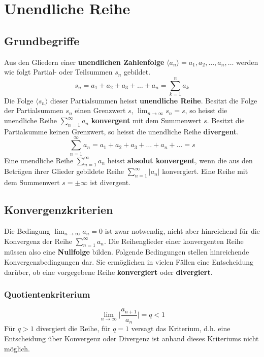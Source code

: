 \section{Unendliche Reihe}
\subsection{Grundbegriffe}
Aus den Gliedern einer \textbf{unendlichen Zahlenfolge} $\langle a_n\rangle=a_1, a_2,\dotso, a_n, \dotso$ werden wie folgt Partial- oder Teilsummen $s_n$ gebildet.
\begin{equation}
\boxed{s_n=a_1+a_2+a_3+\dotso + a_n=\displaystyle \sum_{k=1}^na_k}
\end{equation}
Die Folge $\langle s_n\rangle$ dieser Partialsummen heisst \textbf{unendliche Reihe}. Besitzt die Folge der Partialsummen $s_n$ einen Grenzwert $s$, $\displaystyle \lim_{n\rightarrow \infty}s_n=s$, so heisst die unendliche Reihe $\displaystyle \sum_{n=1}^{\infty}a_n$ \textbf{konvergent} mit dem Summenwert $s$. Besitzt die Partialsumme keinen Grenzwert, so heisst die unendliche Reihe \textbf{divergent}. 
\begin{equation}
\boxed{\displaystyle \sum_{n=1}^{\infty}a_n=a_1+a_2+a_3+\dotso + a_n+\dotso=s}
\end{equation}
Eine unendliche Reihe $\displaystyle \sum_{n=1}^{\infty}a_n$ heisst \textbf{absolut konvergent}, wenn die aus den Beträgen ihrer Glieder gebildete Reihe $\displaystyle \sum_{n=1}^{\infty}\Big\vert a_n\Big\vert$ konvergiert. Eine Reihe mit dem Summenwert $s=\pm\infty$ ist divergent.
\subsection{Konvergenzkriterien}
Die Bedingung $\displaystyle \lim_{n\rightarrow \infty}a_n=0$ ist zwar notwendig, nicht aber hinreichend für die Konvergenz der Reihe $\displaystyle \sum_{n=1}^{\infty}a_n$. Die Reihenglieder einer konvergenten Reihe müssen also eine \textbf{Nullfolge} bilden.
\newline\newline
Folgende Bedingungen stellen hinreichende Konvergenzbedingungen dar. Sie ermöglichen in vielen Fällen eine Entscheidung darüber, ob eine vorgegebene Reihe \textbf{konvergiert} oder \textbf{divergiert}. 
\subsubsection{Quotientenkriterium}
\begin{equation}
\boxed{\displaystyle \lim_{n\rightarrow \infty}\Big\vert\dfrac{a_{n+1}}{a_n} \Big\vert=q<1}
\end{equation}
Für $q>1$ divergiert die Reihe, für $q=1$ versagt das Kriterium, d.h. eine Entscheidung über Konvergenz oder Divergenz ist anhand dieses Kriteriums nicht möglich.
